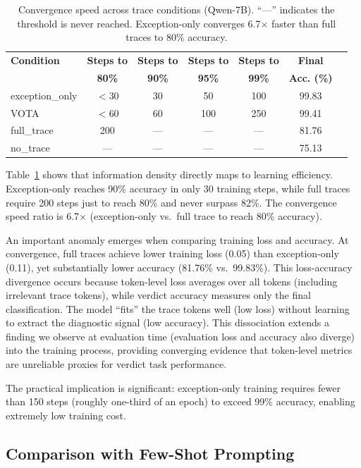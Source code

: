 \documentclass[11pt]{article}
\begin{document}
\begin{table}[t]
\centering
\caption{Convergence speed across trace conditions (Qwen-7B). ``---'' indicates the threshold is never reached. Exception-only converges 6.7$\times$ faster than full traces to 80\% accuracy.}
\label{tab:convergence}
\small
\begin{tabular}{lcccccc}
\toprule
\textbf{Condition} & \textbf{Steps to} & \textbf{Steps to} & \textbf{Steps to} & \textbf{Steps to} & \textbf{Final} \\
 & \textbf{80\%} & \textbf{90\%} & \textbf{95\%} & \textbf{99\%} & \textbf{Acc. (\%)} \\
\midrule
exception\_only & $<$30 & 30 & 50 & 100 & 99.83 \\
VOTA & $<$60 & 60 & 100 & 250 & 99.41 \\
full\_trace & 200 & --- & --- & --- & 81.76 \\
no\_trace & --- & --- & --- & --- & 75.13 \\
\bottomrule
\end{tabular}
\end{table}

Table~\ref{tab:convergence} shows that information density directly maps to learning efficiency. Exception-only reaches 90\% accuracy in only 30 training steps, while full traces require 200 steps just to reach 80\% and never surpass 82\%. The convergence speed ratio is 6.7$\times$ (exception-only vs.\ full trace to reach 80\% accuracy).

An important anomaly emerges when comparing training loss and accuracy. At convergence, full traces achieve lower training loss (0.05) than exception-only (0.11), yet substantially lower accuracy (81.76\% vs.\ 99.83\%). This loss-accuracy divergence occurs because token-level loss averages over all tokens (including irrelevant trace tokens), while verdict accuracy measures only the final classification. The model ``fits'' the trace tokens well (low loss) without learning to extract the diagnostic signal (low accuracy). This dissociation extends a finding we observe at evaluation time (evaluation loss and accuracy also diverge) into the training process, providing converging evidence that token-level metrics are unreliable proxies for verdict task performance.

The practical implication is significant: exception-only training requires fewer than 150 steps (roughly one-third of an epoch) to exceed 99\% accuracy, enabling extremely low training cost.

\subsection{Comparison with Few-Shot Prompting}
\label{sec:fewshot}
\end{document}
